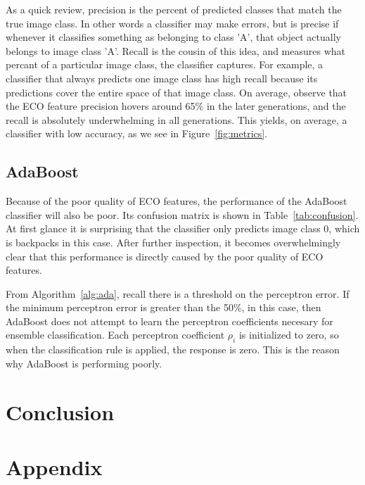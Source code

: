 \documentclass[conference]{IEEEtran}
\begin{document}
As a quick review, precision is the percent of predicted classes that match the true image class. In other words a classifier may make errors, but is precise if whenever it classifies something as belonging to class 'A', that object actually belongs to image class 'A'. Recall is the cousin of this idea, and measures what percant of a particular image class, the classifier captures. For example, a classifier that always predicts one image class has high recall because its predictions cover the entire space of that image class. On average, observe that the ECO feature precision hovers around 65\% in the later generations, and the recall is absolutely underwhelming in all generations. This yields, on average, a classifier with low accuracy, as we see in Figure~\ref{fig:metrics}.
\subsection{AdaBoost}
Because of the poor quality of ECO features, the performance of the AdaBoost classifier will also be poor. Its confusion matrix is shown in Table~\ref{tab:confusion}. At first glance it is surprising that the classifier only predicts image class 0, which is backpacks in this case. After further inspection, it becomes overwhelmingly clear that this performance is directly caused by the poor quality of ECO features.


From Algorithm~\ref{alg:ada}, recall there is a threshold on the perceptron error. If the minimum perceptron error is greater than the 50\%, in this case, then AdaBoost does not attempt to learn the perceptron coefficients necesary for ensemble classification. Each perceptron coefficient $\rho_i$ is initialized to zero, so when the classification rule is applied, the response is zero. This is the reason why AdaBoost is performing poorly. 

\section{Conclusion}
\section{Appendix}
%


\end{document}
